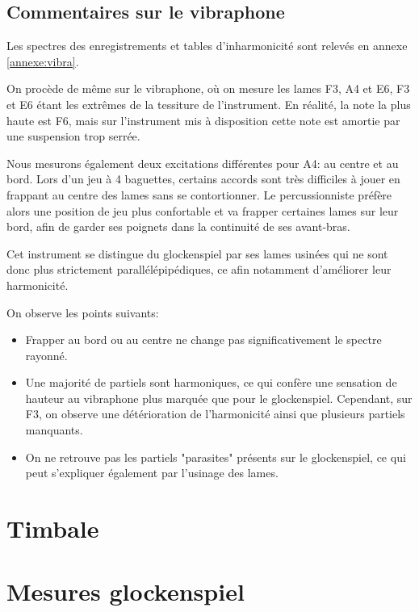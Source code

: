 \documentclass[atiam, article]{rapport} %
\begin{document}
\subsection{Commentaires sur le vibraphone}
Les spectres des enregistrements et tables d'inharmonicité sont relevés en annexe \ref{annexe:vibra}.

On procède de même sur le vibraphone, où on mesure les lames F3, A4 et E6, F3 et E6 étant les extrêmes de la tessiture de l'instrument. En réalité, la note la plus haute est F6, mais sur l'instrument mis à disposition cette note est amortie par une suspension trop serrée.

Nous mesurons également deux excitations différentes pour A4: au centre et au bord. Lors d'un jeu à 4 baguettes, certains accords sont très difficiles à jouer en frappant au centre des lames sans se contortionner. Le percussionniste préfère alors une position de jeu plus confortable et va frapper certaines lames sur leur bord, afin de garder ses poignets dans la continuité de ses avant-bras.

Cet instrument se distingue du glockenspiel par ses lames usinées qui ne sont donc plus strictement parallélépipédiques, ce afin notamment d'améliorer leur harmonicité.

On observe les points suivants:
\begin{itemize}
  \item Frapper au bord ou au centre ne change pas significativement le spectre rayonné.
  \item Une majorité de partiels sont harmoniques, ce qui confère une sensation de hauteur au vibraphone plus marquée que pour le glockenspiel. Cependant, sur F3, on observe une détérioration de l'harmonicité ainsi que plusieurs partiels manquants.
  \item On ne retrouve pas les partiels "parasites" présents sur le glockenspiel, ce qui peut s'expliquer également par l'usinage des lames.
\end{itemize}

\section{Timbale}


\appendix
\section{Mesures glockenspiel}
\label{annexe:glock}
\end{document}
